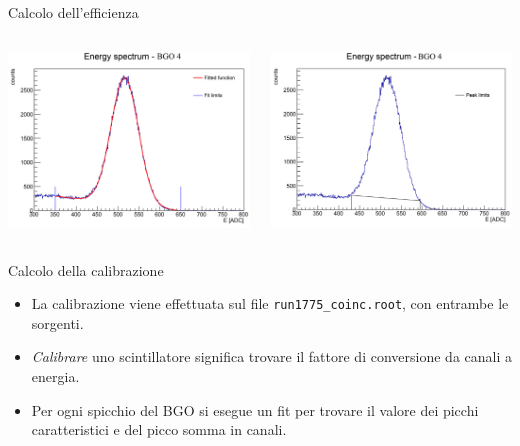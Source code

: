 \documentclass [xcolor=svgnames, 9pt] {beamer}
\begin{document}
\begin{frame}[noframenumbering]{Calcolo dell'efficienza}
	\begin{columns}
		\begin{column}{0.5\textwidth}
			\includegraphics[width=\textwidth]{img/parameter.pdf}
		\end{column}
		\begin{column}{0.5\textwidth}
			\includegraphics[width=\textwidth]{img/trapezoid.pdf}
		\end{column}
	\end{columns}
\end{frame}

\begin{frame}[noframenumbering]{Calcolo della calibrazione}
	\begin{itemize}
		\item La calibrazione viene effettuata sul file \texttt{run1775\_coinc.root}, con entrambe le sorgenti.
		\item \emph{Calibrare} uno scintillatore significa trovare il fattore di conversione da canali a energia.
		\item Per ogni spicchio del BGO si esegue un fit per trovare il valore dei picchi caratteristici e del picco somma in canali.
	\end{itemize}
\end{frame}
\end{document}
